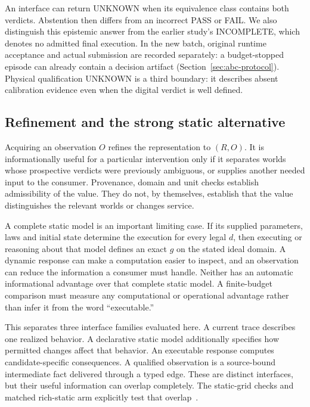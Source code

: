An interface can return UNKNOWN when its equivalence class contains both
verdicts. Abstention then differs from an incorrect PASS or FAIL. We also
distinguish this epistemic answer from the earlier study's INCOMPLETE,
which denotes no admitted final execution. In the new batch, original runtime
acceptance and actual submission are recorded separately: a budget-stopped
episode can already contain a decision artifact
(Section~\ref{sec:abc-protocol}). Physical qualification
UNKNOWN is a third boundary: it describes absent calibration evidence even
when the digital verdict is well defined.

\subsection{Refinement and the strong static alternative}
Acquiring an observation $O$ refines the representation to $(R,O)$. It is
informationally useful for a particular intervention only if it separates
worlds whose prospective verdicts were previously ambiguous, or supplies
another needed input to the consumer. Provenance, domain and unit checks
establish admissibility of the value. They do not, by themselves, establish
that the value distinguishes the relevant worlds or changes service.

A complete static model is an important limiting case. If its supplied
parameters, laws and initial state determine the execution for every legal
$d$, then executing or reasoning about that model defines an exact $g$ on
the stated ideal domain. A dynamic response can make a computation easier
to inspect, and an observation can reduce the information a consumer must
handle. Neither has an automatic informational advantage over that complete
static model. A finite-budget comparison must measure any computational or
operational advantage rather than infer it from the word ``executable.''

This separates three interface families evaluated here. A current trace
describes one realized behavior. A declarative static model additionally
specifies how permitted changes affect that behavior. An executable response
computes candidate-specific consequences. A qualified observation is a
source-bound intermediate fact delivered through a typed edge. These are
distinct interfaces, but their useful information can overlap completely.
The static-grid checks and matched rich-static arm explicitly test that
overlap~\cite{structural,tables}.

